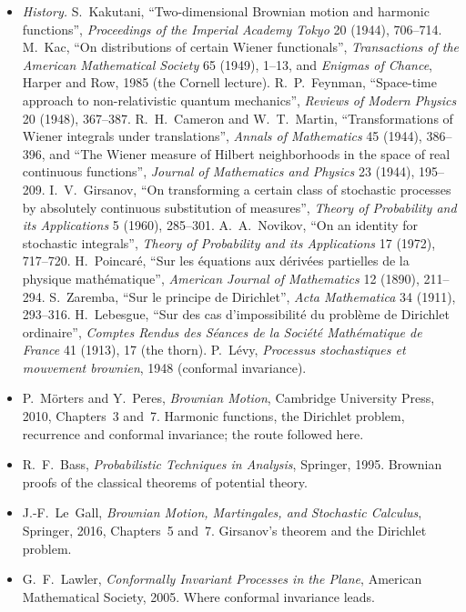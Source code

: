 \begin{itemize}
\item \emph{History.} S.~Kakutani, ``Two-dimensional Brownian motion and harmonic functions'', \emph{Proceedings of the Imperial Academy Tokyo} 20 (1944), 706--714. M.~Kac, ``On distributions of certain Wiener
functionals'', \emph{Transactions of the American Mathematical Society} 65 (1949), 1--13, and \emph{Enigmas of Chance}, Harper and Row, 1985 (the Cornell lecture). R.~P.~Feynman, ``Space-time approach to
non-relativistic quantum mechanics'', \emph{Reviews of Modern Physics} 20 (1948), 367--387. R.~H.~Cameron and W.~T.~Martin, ``Transformations of Wiener integrals under translations'', \emph{Annals of Mathematics}
45 (1944), 386--396, and ``The Wiener measure of Hilbert neighborhoods in the space of real continuous functions'', \emph{Journal of Mathematics and Physics} 23 (1944), 195--209. I.~V.~Girsanov, ``On transforming a
certain class of stochastic processes by absolutely continuous substitution of measures'', \emph{Theory of Probability and its Applications} 5 (1960), 285--301. A.~A.~Novikov, ``On an identity for stochastic integrals'',
\emph{Theory of Probability and its Applications} 17 (1972), 717--720. H.~Poincar\'e, ``Sur les \'equations aux d\'eriv\'ees partielles de la physique math\'ematique'', \emph{American Journal of Mathematics} 12 (1890),
211--294. S.~Zaremba, ``Sur le principe de Dirichlet'', \emph{Acta Mathematica} 34 (1911), 293--316. H.~Lebesgue, ``Sur des cas d'impossibilit\'e du probl\`eme de Dirichlet ordinaire'',
\emph{Comptes Rendus des S\'eances de la Soci\'et\'e Math\'ematique de France} 41 (1913), 17 (the thorn). P.~L\'evy, \emph{Processus stochastiques et mouvement brownien}, 1948 (conformal invariance).
\item P.~M\"orters and Y.~Peres, \emph{Brownian Motion}, Cambridge University Press, 2010, Chapters~3 and~7. Harmonic functions, the Dirichlet problem, recurrence and conformal invariance; the route followed here.
\item R.~F.~Bass, \emph{Probabilistic Techniques in Analysis}, Springer, 1995. Brownian proofs of the classical theorems of potential theory.
\item J.-F.~Le~Gall, \emph{Brownian Motion, Martingales, and Stochastic Calculus}, Springer, 2016, Chapters~5 and~7. Girsanov's theorem and the Dirichlet problem.
\item G.~F.~Lawler, \emph{Conformally Invariant Processes in the Plane}, American Mathematical Society, 2005. Where conformal invariance leads.
\end{itemize}

